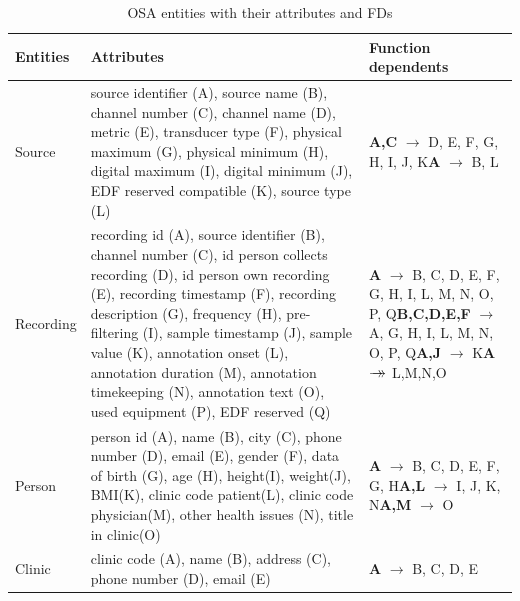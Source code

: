 \begin{table}
\begin{center}
\begin{tabular}{ |p{1.5cm}||p{5cm}|p{6.5cm}|  }
 \hline
 Entities& Attributes& Function dependents\\
 \hline
 Source& source identifier (A), source name (B), channel number (C), channel name (D), metric (E), transducer type (F), physical maximum (G), physical minimum (H), digital maximum (I), digital minimum (J), EDF reserved compatible (K), source type (L)& \textbf{A,C} $\rightarrow$ D, E, F, G, H, I, J, K\newline \textbf{A} $\rightarrow$ B, L\\
 \hline
 Recording& recording id (A), source identifier (B), channel number (C), id person collects recording (D), id person own recording (E), recording timestamp (F), recording description (G), frequency (H), pre-filtering (I), sample timestamp (J), sample value (K), annotation onset (L), annotation duration (M), annotation timekeeping (N), annotation text (O), used equipment (P), EDF reserved (Q)& \textbf{A} $\rightarrow$ B, C, D, E, F, G, H, I, L, M, N, O, P, Q\newline \textbf{B,C,D,E,F} $\rightarrow$ A, G, H, I, L, M, N, O, P, Q\newline \textbf{A,J} $\rightarrow$ K\newline \textbf{A} $\rightarrow\mathrel{\mkern-14mu}\rightarrow$ L,M,N,O\\
 \hline
 Person& person id (A), name (B), city (C), phone number (D), email (E), gender (F), data of birth (G), age (H), height(I), weight(J), BMI(K), clinic code patient(L), clinic code physician(M), other health issues (N), title in clinic(O)& \textbf{A} $\rightarrow$ B, C, D, E, F, G, H\newline \textbf{A,L} $\rightarrow$ I, J, K, N\newline \textbf{A,M} $\rightarrow$ O\\
 \hline
 Clinic& clinic code (A), name (B), address (C), phone number (D), email (E)& \textbf{A} $\rightarrow$ B, C, D, E\\
 \hline
\end{tabular}
\end{center}
\caption{OSA entities with their attributes and FDs}
\label{tab:EntitiesFDs}
\end{table}

